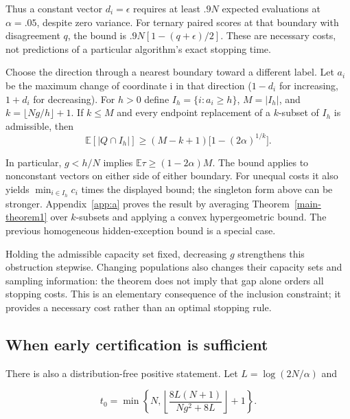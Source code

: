 Thus a constant vector \(d_i=\epsilon\) requires at least \(.9N\) expected evaluations at \(\alpha=.05\), despite zero variance. For ternary paired scores at that boundary with disagreement \(q\), the bound is \(.9N[1-(q+\epsilon)/2]\). These are necessary costs, not predictions of a particular algorithm's exact stopping time.

\begin{theorem}\label{main-theorem2} Choose the direction through a nearest boundary toward a different label. Let \(a_i\) be the maximum change of coordinate i in that direction (\(1-d_i\) for increasing, \(1+d_i\) for decreasing). For \(h>0\) define \(I_h=\{i:a_i\ge h\}\), \(M=|I_h|\), and \(k=\lfloor Ng/h\rfloor+1\). If \(k\le M\) and every endpoint replacement of a \(k\)-subset of \(I_h\) is admissible, then
\begin{equation}\label{eq:5-2}
\mathbb E[|Q\cap I_h|]\ge(M-k+1)\bigl[1-(2\alpha)^{1/k}\bigr].
\end{equation}
\end{theorem}

In particular, \(g<h/N\) implies \(\mathbb E\tau\ge(1-2\alpha)M\). The bound applies to nonconstant vectors on either side of either boundary. For unequal costs it also yields \(\min_{i\in I_h}c_i\) times the displayed bound; the singleton form above can be stronger. Appendix~\ref{app:a} proves the result by averaging Theorem~\ref{main-theorem1} over \(k\)-subsets and applying a convex hypergeometric bound. The previous homogeneous hidden-exception bound is a special case.

Holding the admissible capacity set fixed, decreasing \(g\) strengthens this obstruction stepwise. Changing populations also changes their capacity sets and sampling information: the theorem does not imply that gap alone orders all stopping costs. This is an elementary consequence of the inclusion constraint; it provides a necessary cost rather than an optimal stopping rule.

\subsection{When early certification is sufficient}\label{when-early-certification-is-sufficient}

There is also a distribution-free positive statement. Let \(L=\log(2N/\alpha)\) and

\begin{equation}\label{eq:5-3}
t_0=\min\left\{N,\left\lfloor\frac{8L(N+1)}{Ng^2+8L}\right\rfloor+1\right\}.
\end{equation}

